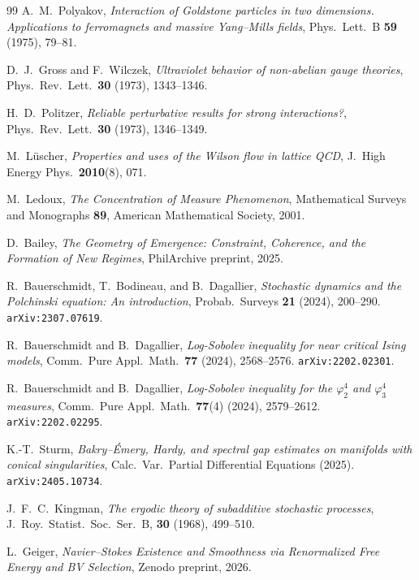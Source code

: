 \documentclass[12pt,a4paper]{article}
\theoremstyle{definition}
\theoremstyle{plain}
\theoremstyle{remark}
\begin{document}
\begin{thebibliography}{99}
A.~M.~Polyakov, \emph{Interaction of Goldstone particles in two dimensions.
Applications to ferromagnets and massive Yang--Mills fields},
Phys.\ Lett.\ B \textbf{59} (1975), 79--81.

D.~J.~Gross and F.~Wilczek, \emph{Ultraviolet behavior of non-abelian gauge theories},
Phys.\ Rev.\ Lett.\ \textbf{30} (1973), 1343--1346.

H.~D.~Politzer, \emph{Reliable perturbative results for strong interactions?},
Phys.\ Rev.\ Lett.\ \textbf{30} (1973), 1346--1349.

M.~L\"uscher, \emph{Properties and uses of the Wilson flow in lattice QCD},
J.\ High Energy Phys.\ \textbf{2010}(8), 071.

M.~Ledoux, \emph{The Concentration of Measure Phenomenon},
Mathematical Surveys and Monographs \textbf{89}, American Mathematical Society, 2001.

D.~Bailey, \emph{The Geometry of Emergence: Constraint, Coherence, and the Formation of New Regimes}, PhilArchive preprint, 2025.

R.~Bauerschmidt, T.~Bodineau, and B.~Dagallier, \emph{Stochastic dynamics and the Polchinski equation: An introduction}, Probab.\ Surveys \textbf{21} (2024), 200--290. \texttt{arXiv:2307.07619}.

R.~Bauerschmidt and B.~Dagallier, \emph{Log-Sobolev inequality for near critical Ising models}, Comm.\ Pure Appl.\ Math.\ \textbf{77} (2024), 2568--2576. \texttt{arXiv:2202.02301}.

R.~Bauerschmidt and B.~Dagallier, \emph{Log-Sobolev inequality for the $\varphi^4_2$ and $\varphi^4_3$ measures}, Comm.\ Pure Appl.\ Math.\ \textbf{77}(4) (2024), 2579--2612. \texttt{arXiv:2202.02295}.

K.-T.~Sturm, \emph{Bakry--\'Emery, Hardy, and spectral gap estimates on manifolds with conical singularities}, Calc.\ Var.\ Partial Differential Equations (2025). \texttt{arXiv:2405.10734}.

J.~F.~C.~Kingman, \textit{The ergodic theory of subadditive stochastic processes}, J.~Roy.\ Statist.\ Soc.\ Ser.~B, \textbf{30} (1968), 499--510.

L.~Geiger, \emph{Navier--Stokes Existence and Smoothness via Renormalized Free Energy and BV Selection}, Zenodo preprint, 2026.


\end{thebibliography}
\end{document}
